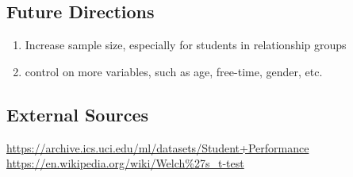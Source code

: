 \documentclass[]{article}
\providecommand{\tightlist}{%
  \setlength{\itemsep}{0pt}\setlength{\parskip}{0pt}}
\begin{document}
\subsection{Future Directions}\label{future-directions}

\begin{enumerate}
\def\labelenumi{\arabic{enumi}.}
\tightlist
\item
  Increase sample size, especially for students in relationship groups
\item
  control on more variables, such as age, free-time, gender, etc.
\end{enumerate}

\subsection{External Sources}\label{external-sources}

\url{https://archive.ics.uci.edu/ml/datasets/Student+Performance}
\url{https://en.wikipedia.org/wiki/Welch\%27s_t-test}
\end{document}
